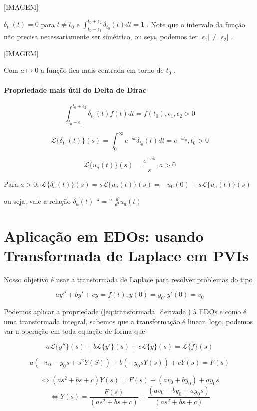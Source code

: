 [IMAGEM]

\( \delta _{t_0} (t) = 0 \) para \( t \neq t_0 \) e \( \int_{t_0 - \epsilon_1}^{t_0 + \epsilon_2} \delta_{t_0} (t) dt = 1 \) .
Note que o intervalo da função não precisa necessariamente ser simétrico, ou seja, podemos
ter \( |\epsilon_1| \neq  | \epsilon_2 | \) .


[IMAGEM]

Com \( a \mapsto 0 \) a função fica mais centrada em torno de \( t_0 \) .

\paragraph{Propriedade mais útil do Delta de Dirac}

\[ \int_{t_0- \epsilon_1}^{t_0 + \epsilon_2} \delta_{t_0} (t) f(t) dt = f(t_0), \epsilon_1, \epsilon_2 > 0 \]



\[ \mathcal{L}\{ \delta_{t_0}(t) \} (s) = \int_{0}^{\infty} e^{-st} \delta_{t_0}(t) dt = e^{-st_0}, t_0 > 0 \]

\[ \mathcal{L}\{ u_a(t) \} (s) = \frac{e^{-as}}{s} , a> 0\]


Para \( a > 0 \): \( \mathcal{L} \{ \delta_a (t)  \} (s) = s \mathcal{L}\{ u_a(t) \} (s) = -u_0 (0) + s \mathcal{L}\{ u_a(t) \} (s) \) 

ou seja, vale a relação \( \delta_a (t)\) ``$=$'' \( \frac{d}{dt}u_a(t) \) 


\section{Aplicação em EDOs: usando Transformada de Laplace em PVIs}

Nosso objetivo é usar a transformada de Laplace para resolver problemas do tipo

\[ a y'' + by' + cy = f(t), y(0) = y_0, y'(0) = v_0  \]

Podemos aplicar a propriedade (\ref{eq:transformada_derivada}) à EDOs e como
é uma transformada integral, sabemos que a transformação é linear, logo,
podemos var a operação em toda equação de forma que


\[ a\mathcal{L} \{y''\} (s) + b \mathcal{L} \{y'\} (s) + c \mathcal{L} \{y\} (s) = \mathcal{L} \{f\} (s) \]

\[ a \left( -v_0 - y_0 s + s^2 Y(S) \right)  + b \left( -y_0 sY(s) \right) + c Y(s) = F(s) \]

\[ \Leftrightarrow (a s^2 + bs + c) Y(s) = F(s) + (a v_0 + b y_0) + a y_0 s \]
\[ \Leftrightarrow Y(s) = \frac{F(s)}{(as^2 + bs + c)} + \frac{(a v_0 + b y_0 + a y_0 s)}{(as^2 + bs + c)} \]


